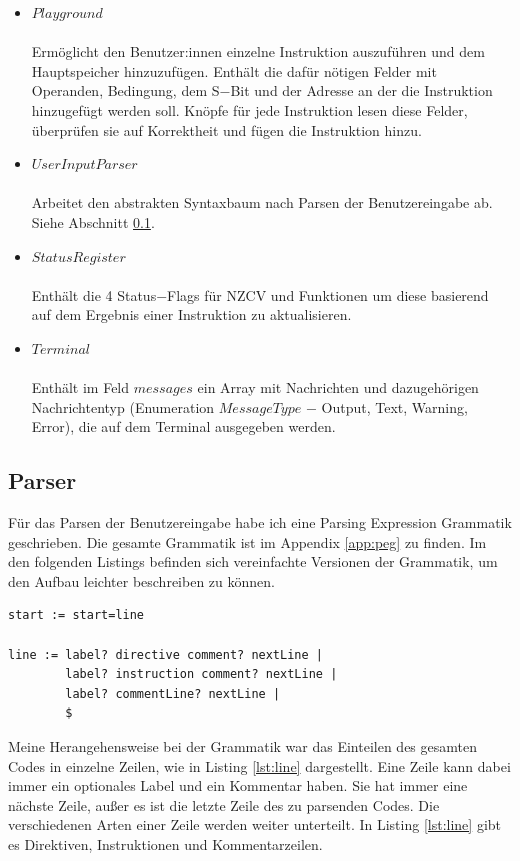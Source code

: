 \documentclass[a4paper, 11pt, onecolumn]{article}
\begin{document}
\begin{itemize}
\item $Playground$\\ \\Ermöglicht den Benutzer:innen einzelne Instruktion auszuführen und dem Hauptspeicher hinzuzufügen. Enthält die dafür nötigen Felder mit Operanden, Bedingung, dem S$-$Bit und der Adresse an der die Instruktion hinzugefügt werden soll. Knöpfe für jede Instruktion lesen diese Felder, überprüfen sie auf Korrektheit und fügen die Instruktion hinzu.
\item $UserInputParser$\\ \\Arbeitet den abstrakten Syntaxbaum nach Parsen der Benutzereingabe ab. Siehe Abschnitt \ref{sec:parser}.
\item $StatusRegister$\\ \\Enthält die 4 Status$-$Flags für NZCV und Funktionen um diese basierend auf dem Ergebnis einer Instruktion zu aktualisieren.
\item $Terminal$\\ \\Enthält im Feld $messages$ ein Array mit Nachrichten und dazugehörigen Nachrichtentyp (Enumeration $MessageType$ $-$ Output, Text, Warning, Error), die auf dem Terminal ausgegeben werden.
\end{itemize}

\subsection{Parser}\label{sec:parser}

Für das Parsen der Benutzereingabe habe ich eine Parsing Expression Grammatik \cite{peg} geschrieben. Die gesamte Grammatik ist im Appendix \ref{app:peg} zu finden. Im den folgenden Listings befinden sich vereinfachte Versionen der Grammatik, um den Aufbau leichter beschreiben zu können.\\

\begin{lstlisting}[basicstyle=\ttfamily\footnotesize, backgroundcolor=\color{backcolour}, caption={Einteilung in Zeilen},captionpos=b, label={lst:line}]
start := start=line

line := label? directive comment? nextLine |
        label? instruction comment? nextLine |
        label? commentLine? nextLine |
        $
\end{lstlisting}

Meine Herangehensweise bei der Grammatik war das Einteilen des gesamten Codes in einzelne Zeilen, wie in Listing \ref{lst:line} dargestellt. Eine Zeile kann dabei immer ein optionales Label und ein Kommentar haben. Sie hat immer eine nächste Zeile, außer es ist die letzte Zeile des zu parsenden Codes. Die verschiedenen Arten einer Zeile werden weiter unterteilt. In Listing \ref{lst:line} gibt es Direktiven, Instruktionen und Kommentarzeilen. \\
\end{document}
